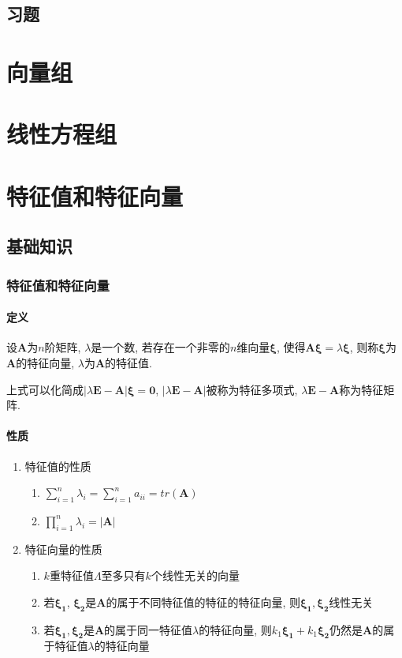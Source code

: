 \section{习题}
\chapter{向量组}
\chapter{线性方程组}

\chapter{特征值和特征向量}
\section{基础知识}
\subsection{特征值和特征向量}
\subsubsection{定义}
设$ \bm{A} $为$ n $阶矩阵, $ \lambda $是一个数, 若存在一个非零的$ n $维向量$ \bm{\xi} $, 使得$ \bm{A}\bm{\xi}=\lambda \bm{\xi} $, 则称$ \bm{\xi} $为$ \bm{A} $的特征向量, $ \lambda $为$ \bm{A} $的特征值. 
\par 上式可以化简成$ \left| \lambda \bm{E}-\bm{A}\right|\bm{\xi}=\bm{0} $, $ \left| \lambda \bm{E}-\bm{A}\right| $被称为特征多项式, $ \lambda \bm{E}-\bm{A} $称为特征矩阵.
\subsubsection{性质}
\begin{enumerate}
	\item 特征值的性质
	\begin{enumerate}
		\item $ \sum_{i=1}^{n}\lambda_{i}=\sum_{i=1}^{n}a_{ii}=tr(\bm{A}) $
		\item $ \prod_{i=1}^{n}\lambda_{i}=\left| \bm{A}\right| $
	\end{enumerate}
	\item 特征向量的性质
	\begin{enumerate}
		\item $ k $重特征值$ \Lambda $至多只有$ k $个线性无关的向量
		\item 若$ \bm{\xi_1} $, $ \bm{\xi_2} $是$ \bm{A} $的属于不同特征值的特征的特征向量, 则$ \bm{\xi_1}, \bm{\xi_2} $线性无关
		\item 若$ \bm{\xi_1}, \bm{\xi_2} $是$ \bm{A} $的属于同一特征值$ \lambda $的特征向量, 则$ k_1\bm{\xi_1} + k_1\bm{\xi_2} $仍然是$ \bm{A} $的属于特征值$ \lambda $的特征向量
	\end{enumerate}
\end{enumerate}
